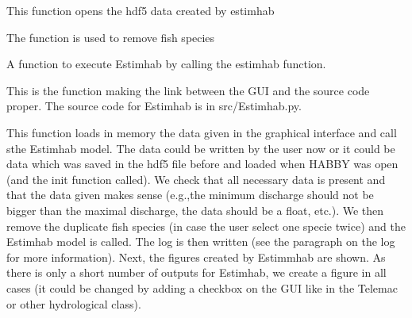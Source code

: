 \documentclass[letterpaper,10pt,english]{sphinxmanual}
\begin{document}
\begin{fulllineitems}
\begin{fulllineitems}
\label{\detokenize{index:src_GUI.estimhab_GUI.EstimhabW.open_estimhab_hdf5}}
This function opens the hdf5 data created by estimhab

\end{fulllineitems}


\begin{fulllineitems}
\label{\detokenize{index:src_GUI.estimhab_GUI.EstimhabW.remove_fish}}
The function is used to remove fish species

\end{fulllineitems}


\begin{fulllineitems}
\label{\detokenize{index:src_GUI.estimhab_GUI.EstimhabW.run_estmihab}}
A function to execute Estimhab by calling the estimhab function.


This is the function making the link between the GUI and the source code proper. The source code for Estimhab
is in src/Estimhab.py.

This function loads in memory the data given in the graphical interface and call sthe Estimhab model.
The data could be written by the user now or it could be data which was saved in the hdf5 file before and
loaded when HABBY was open (and the init function called).  We check that all necessary data is present and
that the data given makes sense (e.g.,the minimum discharge should not be bigger than the maximal discharge,
the data should be a float, etc.). We then remove the duplicate fish species (in case the user select one
specie twice) and the Estimhab model is called. The log is then written (see the paragraph on the log for more
information). Next, the figures created by Estimmhab are shown. As there is only a short number of outputs
for Estimhab, we create a figure in all cases (it could be changed by adding a checkbox on the GUI like
in the Telemac or other hydrological class).

\end{fulllineitems}


\end{fulllineitems}
\end{document}
